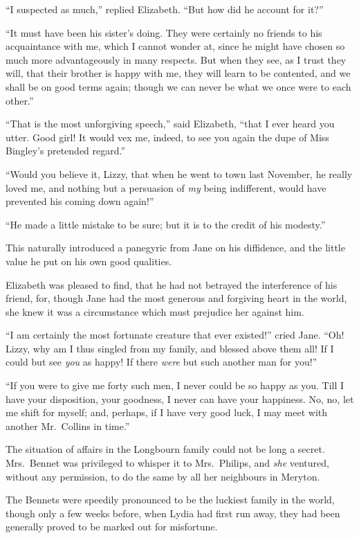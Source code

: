 “I suspected as much,” replied Elizabeth. “But how
did he account for it?”

“It must have been his sister’s doing. They were
certainly no friends to his acquaintance with me, which
I cannot wonder at, since he might have chosen so much
more advantageously in many respects. But when they
see, as I trust they will, that their brother is happy with
me, they will learn to be contented, and we shall be on
good terms again; though we can never be what we once
were to each other.”

“That is the most unforgiving speech,” said Elizabeth,
“that I ever heard you utter. Good girl! It would vex
me, indeed, to see you again the dupe of Miss Bingley’s
pretended regard.”

“Would you believe it, Lizzy, that when he went to
town last November, he really loved me, and nothing but
a persuasion of \textit{my} being indifferent, would have prevented
his coming down again!”

“He made a little mistake to be sure; but it is to
the credit of his modesty.”

This naturally introduced a panegyric from Jane on
his diffidence, and the little value he put on his own good
qualities.

Elizabeth was pleased to find, that he had not betrayed
the interference of his friend, for, though Jane had the
most generous and forgiving heart in the world, she knew it
was a circumstance which must prejudice her against him.

“I am certainly the most fortunate creature that ever
existed!” cried Jane. “Oh! Lizzy, why am I thus
singled from my family, and blessed above them all!
If I could but see \textit{you} as happy! If there \textit{were} but such
another man for you!”

“If you were to give me forty such men, I never could
be so happy as you. Till I have your disposition, your
goodness, I never can have your happiness. No, no, let
me shift for myself; and, perhaps, if I have very good
luck, I may meet with another Mr.\ Collins in time.”

The situation of affairs in the Longbourn family could
not be long a secret. Mrs.\ Bennet was privileged to whisper
it to Mrs.\ Philips, and \textit{she} ventured, without any permission,
to do the same by all her neighbours in Meryton.

The Bennets were speedily pronounced to be the luckiest
family in the world, though only a few weeks before, when
Lydia had first run away, they had been generally proved
to be marked out for misfortune.

